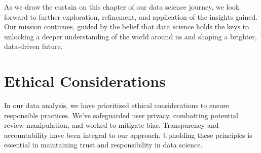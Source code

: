 As we draw the curtain on this chapter of our data science journey, we look forward to further exploration, refinement, and application of the insights gained. Our mission continues, guided by the belief that data science holds the keys to unlocking a deeper understanding of the world around us and shaping a brighter, data-driven future.

\section{Ethical Considerations}
In our data analysis, we have prioritized ethical considerations to ensure responsible practices. We've safeguarded user privacy, combatting potential review manipulation, and worked to mitigate bias. Transparency and accountability have been integral to our approach. Upholding these principles is essential in maintaining trust and responsibility in data science.
